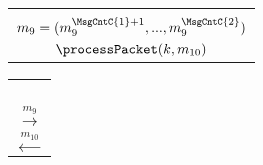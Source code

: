 \begin{figure*}[!h]
\begin{center}
\begin{enumerate}
{\begin{minipage}[t]{0.38\textwidth}
\begin{tabular}{c}
    $ $ \\
    $m_{9} = (m_{9}^{\MsgCntC{1}+1},...,m_{9}^{\MsgCntC{2}})$ \\
    $\processPacket(k, m_{10})$ \\
   \end{tabular}
  \end{minipage}%
 }
 \begin{minipage}[t]{0.13\textwidth}
  \centering
  \begin{tabular}{c}
   $ $ \\
   $ $ \\
   $ $ \\
   $ $ \\
   $\xrightarrow{m_{9}}$ \\
   $\xleftarrow{m_{10}}$ \\
  \end{tabular}
 \end{minipage}%
\end{enumerate}

 \end{center}
\end{figure*}